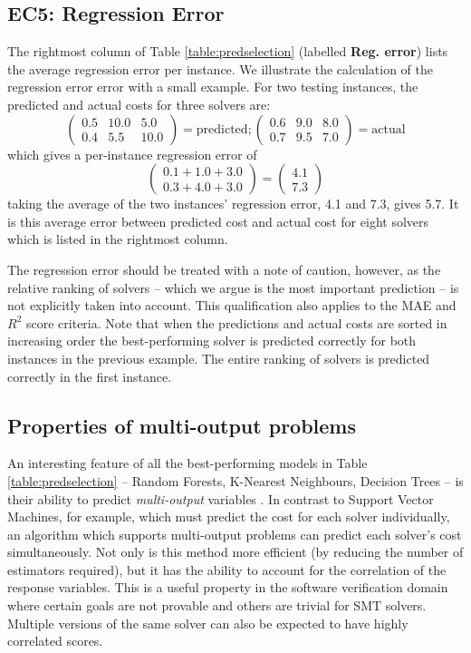 \subsection{EC5: Regression Error}

The rightmost column of Table \ref{table:predselection} (labelled \textbf{Reg. error}) lists the average regression error per instance. 
We illustrate the calculation of the regression error error with a small example. For two testing instances, the predicted and actual costs for three solvers are: 
\[ \left( \begin{array}{ccc}
0.5 & 10.0 & 5.0 \\
0.4 & 5.5 & 10.0  \end{array} \right) = \text{predicted};
\left( \begin{array}{ccc}
0.6 & 9.0 & 8.0 \\
0.7 & 9.5 & 7.0 \end{array} \right) = \text{actual}\]
which gives a per-instance regression error of
\[ \left( \begin{array}{c}
0.1 + 1.0 + 3.0 \\
0.3 + 4.0 + 3.0
\end{array}  \right) = 
\left( \begin{array}{c}
4.1 \\
7.3
\end{array}  \right) \] 
taking the average of the two instances' regression error, 4.1 and 7.3, gives 5.7.
It is this average error between predicted cost and actual cost for eight solvers which is listed in the rightmost column.

The regression error should be treated with a note of caution, however, as the relative ranking of solvers -- which we argue is the most important prediction -- is not explicitly taken into account.
This qualification also applies to the MAE and $R^2$ score criteria. 
Note that when the predictions and actual costs are sorted in increasing order the best-performing solver is predicted correctly for both instances in the previous example.
The entire ranking of solvers is predicted correctly in the first instance.

\subsection{Properties of multi-output problems}
\label{sub:multi}

An interesting feature of all the best-performing models in Table \ref{table:predselection} -- Random Forests, K-Nearest Neighbours, Decision Trees -- is their ability to predict \textit{multi-output} variables \cite{multisurvey}. 
In contrast to Support Vector Machines, for example, which must predict the cost for each solver individually, an algorithm which supports multi-output problems can predict each solver's cost simultaneously. 
Not only is this method more efficient (by reducing the number of estimators required), but it has the ability to account for the correlation of the response variables. 
This is a useful property in the software verification domain where certain goals are not provable and others are trivial for SMT solvers. 
Multiple versions of the same solver can also be expected to have highly correlated scores.


